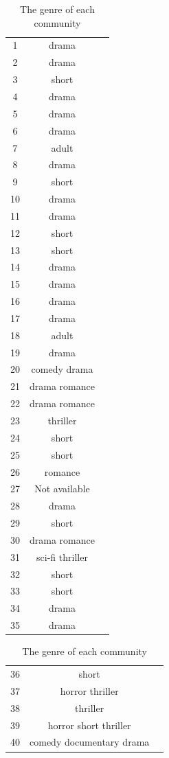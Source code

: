 \documentclass{article}
\begin{document}
\begin {table}[htbp]
\caption{The genre of each community}
\label{tb:5_1}
\begin{adjustbox}{center}

\begin{tabular}{|c|c|c}
\hline
1 & drama\\
2 & drama\\
3& short\\
4&drama\\
5&drama\\
6&drama\\
7&adult\\
8&drama\\
9&short\\
10&drama\\
11&drama\\
12&short\\
13&short\\
14&drama\\
15&drama\\
16&drama\\
17&drama\\
18&adult\\
19&drama\\
20&comedy drama\\
21&drama romance\\
22&drama romance\\
23&thriller\\
24&short\\
25&short\\
26&romance\\
27& Not available\\
28&drama\\
29&short\\
30&drama romance\\
31&sci-fi thriller\\
32& short\\
33& short\\
34& drama\\
35& drama\\
\hline
\end{tabular}
\begin{tabular}{|c|c|c}
\hline
36& short\\
37&horror thriller\\
38& thriller\\
39& horror short thriller\\
40& comedy documentary drama\\


\end{tabular}
\end{adjustbox}
\end{table}
\end{document}
